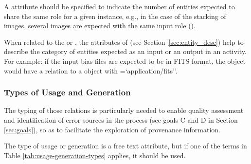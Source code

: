A  attribute should be specified to indicate the number of entities expected to share the same role for a given  instance, e.g., in the case of the stacking of images, several images are expected with the same input role ().

When related to the  or , the attributes of  (see Section~\ref{sec:entity_desc}) help to describe the category of entities expected as an input or an output in an activity.
For example: if the input bias files are expected to be in FITS format, the  object would have a relation to a  object with =`application/fits''.


\subsubsection{Types of Usage and Generation}
\label{sec:ugtypes}

The typing of those relations is particularly needed to enable quality assessment and identification of error sources in the process (see goals C and D in Section \ref{sec:goals}), so as to facilitate the exploration of provenance information. 

The type of usage or generation is a free text attribute, but if one of the terms in Table \ref{tab:usage-generation-types} applies, it should be used.

